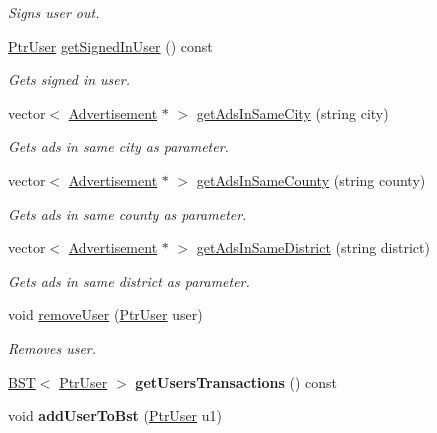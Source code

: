 \begin{DoxyCompactItemize}
\begin{DoxyCompactList}\small\item\em Signs user out. \end{DoxyCompactList}\item 
\hyperlink{class_ptr_user}{Ptr\+User} \hyperlink{class_data_aed1da5f3b40fd0bb36288a6c9aaaaeb1}{get\+Signed\+In\+User} () const 
\begin{DoxyCompactList}\small\item\em Gets signed in user. \end{DoxyCompactList}\item 
vector$<$ \hyperlink{class_advertisement}{Advertisement} $\ast$ $>$ \hyperlink{class_data_afd47f962d9f835cd66905fcafd1a0af7}{get\+Ads\+In\+Same\+City} (string city)
\begin{DoxyCompactList}\small\item\em Gets ads in same city as parameter. \end{DoxyCompactList}\item 
vector$<$ \hyperlink{class_advertisement}{Advertisement} $\ast$ $>$ \hyperlink{class_data_aaee3cddf7c073f9e2aa9f84e13b03ba8}{get\+Ads\+In\+Same\+County} (string county)
\begin{DoxyCompactList}\small\item\em Gets ads in same county as parameter. \end{DoxyCompactList}\item 
vector$<$ \hyperlink{class_advertisement}{Advertisement} $\ast$ $>$ \hyperlink{class_data_af31d6cf3249bfdff2f4ab4ed8d2676c5}{get\+Ads\+In\+Same\+District} (string district)
\begin{DoxyCompactList}\small\item\em Gets ads in same district as parameter. \end{DoxyCompactList}\item 
void \hyperlink{class_data_af1080d7b9dd2a243a1659b8f259727af}{remove\+User} (\hyperlink{class_ptr_user}{Ptr\+User} user)
\begin{DoxyCompactList}\small\item\em Removes user. \end{DoxyCompactList}\item 
\hypertarget{class_data_adaeb0ac1a1c1e7f1cca5ad5046ca4fd3}{}\hyperlink{class_b_s_t}{B\+S\+T}$<$ \hyperlink{class_ptr_user}{Ptr\+User} $>$ {\bfseries get\+Users\+Transactions} () const \label{class_data_adaeb0ac1a1c1e7f1cca5ad5046ca4fd3}

\item 
\hypertarget{class_data_a7284e7809a0b3cc38d537e545c6ddf1a}{}void {\bfseries add\+User\+To\+Bst} (\hyperlink{class_ptr_user}{Ptr\+User} u1)\label{class_data_a7284e7809a0b3cc38d537e545c6ddf1a}


\end{DoxyCompactItemize}
